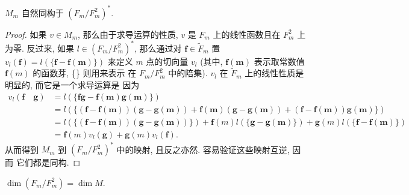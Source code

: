 \begin{lem}
    $M_m$ 自然同构于 $(F_m/F_m^2)^*$.
\end{lem}
\begin{proof}
如果 $v \in M_m$, 那么由于求导运算的性质, $v$ 是 $F_m$ 上的线性函数且在 $F_m^2$ 上为零. 反过来, 如果 $l \in\left(F_m / F_m^2\right)^*$, 那么通过对 $\mathbf{f} \in \widetilde{F}_m$ 置 $v_l(\mathbf{f})=l(\{\mathbf{f}-\mathbf{f}(\mathbf{m})\})$ 来定义 $m$ 点的切向量 $v_l$ (其中, $\mathbf{f}(\mathbf{m})$ 表示取常数值 $\mathbf{f}(m)$ 的函数芽, \{\} 则用来表示 在 $F_m / F_m^2$ 中的陪集). $v_l$ 在 $\widetilde{F}_m$ 上的线性性质是明显的, 而它是一个求导运算是 因为
$$
\begin{aligned}
v_l(\mathbf{f} \quad \mathbf{g}) & =l(\{\mathbf{f} \mathbf{g}-\mathbf{f}(\mathbf{m}) \mathbf{g}(\mathbf{m})\}) \\
& =l(\{(\mathbf{f}-\mathbf{f}(\mathbf{m}))(\mathbf{g}-\mathbf{g}(\mathbf{m}))+\mathbf{f}(\mathbf{m})(\mathbf{g}-\mathbf{g}(\mathbf{m}))+(\mathbf{f}-\mathbf{f}(\mathbf{m})) \mathbf{g}(\mathbf{m})\}) \\
& =l(\{(\mathbf{f}-\mathbf{f}(\mathbf{m}))(\mathbf{g}-\mathbf{g}(\mathbf{m}))\})+\mathbf{f}(m) l(\{\mathbf{g}-\mathbf{g}(\mathbf{m})\})+\mathbf{g}(m) l(\{\mathbf{f}-\mathbf{f}(\mathbf{m})\}) \\
& =\mathbf{f}(m) v_{l}(\mathbf{g})+\mathbf{g}(m) v_{l} (\mathbf{f}) .
\end{aligned}
$$
从而得到 $M_m$ 到 $\left(F_m / F_m^2\right)^*$ 中的映射, 且反之亦然. 容易验证这些映射互逆, 因而 它们都是同构.
\end{proof}
\begin{thm}\label{thm:dimension equal}
$\dim\left(F_m / F_m^2\right)=\dim M$.
\end{thm}

